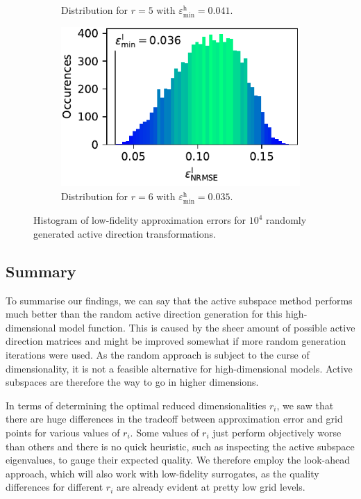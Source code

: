 \documentclass[
  a4paper,  %
  twoside,  %
  bibliography=totoc,
  headsepline,
  cleardoublepage=empty,
  parskip=half,
  draft=false
]{scrbook}
\begin{document}
\begin{mdframed}[style=style]
\begin{figure}[H]
\begin{subfigure}{.5\textwidth}
  \caption{Distribution for $r=5$ with $\varepsilon^\mathrm{h}_{\mathrm{min}}=0.041$.}
\vspace{3mm}
\label{fig:ishigami_hist_2}
\end{subfigure}%
\begin{subfigure}{.5\textwidth}
  \centering
   \includegraphics[width=0.95\linewidth]{graphics/ww_hist_6}
  \caption{Distribution for $r=6$ with $\varepsilon^\mathrm{h}_{\mathrm{min}}=0.035$.}
\vspace{3mm}
\label{fig:ishigami_hist_1}
\end{subfigure}
\delimit
\caption{Histogram of low-fidelity approximation errors for $10^4$ randomly generated active direction transformations.}
\label{fig:ww_hist_all}
\end{figure}
\end{mdframed}

\subsection{Summary}

To summarise our findings, we can say that the active subspace method performs much better than the random active direction generation for this high-dimensional model function.
This is caused by the sheer amount of possible active direction matrices and might be improved somewhat if more random generation iterations were used.
As the random approach is subject to the curse of dimensionality, it is not a feasible alternative for high-dimensional models.
Active subspaces are therefore the way to go in higher dimensions.

In terms of determining the optimal reduced dimensionalities $r_i$, we saw that there are huge differences in the tradeoff between approximation error and grid points for various values of $r_i$.
Some values of $r_i$ just perform objectively worse than others and there is no quick heuristic, such as inspecting the active subspace eigenvalues, to gauge their expected quality.
We therefore employ the look-ahead approach, which will also work with low-fidelity surrogates, as the quality differences for different $r_i$ are already evident at pretty low grid levels.
\end{document}
